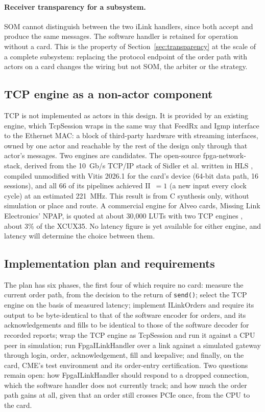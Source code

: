 \documentclass[11pt]{article}
\begin{document}
\paragraph{Receiver transparency for a subsystem.} SOM cannot
distinguish between the two iLink handlers, since both accept and produce the
same messages. The software handler is retained for operation without a card.
This is the property of Section~\ref{sec:transparency} at the scale of a
complete subsystem: replacing the protocol endpoint of the order path with
actors on a card changes the wiring but not SOM, the arbiter or the strategy.

\subsection{TCP engine as a non-actor component}

TCP is not implemented as actors in this design. It is provided by an existing
engine, which TcpSession wraps in the same way that FeedRx and Igmp interface
to the Ethernet MAC: a block of third-party hardware with streaming interfaces,
owned by one actor and reachable by the rest of the design only through that
actor's messages. Two engines are candidates. The open-source
fpga-network-stack, derived from the 10~Gb/s TCP/IP stack of Sidler et al.
written in HLS \cite{sidler2015,fpgastack}, compiled unmodified with Vitis
2026.1 for the card's device (64-bit data path, 16 sessions), and all 66 of its
pipelines achieved II~$=1$ (a new input every clock cycle) at an estimated 221~MHz. This result is from C
synthesis only, without simulation or place and route. A commercial engine for
Alveo cards, Missing Link Electronics' NPAP, is quoted at about 30{,}000 LUTs
with two TCP engines \cite{npap}, about 3\% of the XCUX35. No latency figure is
yet available for either engine, and latency will determine the choice between
them.

\subsection{Implementation plan and requirements}

The plan has six phases, the first four of which require no card: measure the
current order path, from the decision to the return of \texttt{send()}; select
the TCP engine on the basis of measured latency; implement ILinkOrders and
require its output to be byte-identical to that of the software encoder for
orders, and its acknowledgements and fills to be identical to those of the
software decoder for recorded reports; wrap the TCP engine as TcpSession and
run it against a CPU peer in simulation; run FpgaILinkHandler over a link
against a simulated gateway through login, order, acknowledgement, fill and
keepalive; and finally, on the card, CME's test environment and its
order-entry certification. Two questions remain open: how FpgaILinkHandler
should respond to a dropped connection, which the software handler does not
currently track; and how much the order path gains at all, given that an order
still crosses PCIe once, from the CPU to the card.
\end{document}
